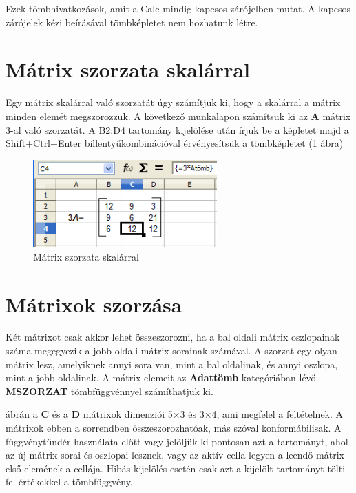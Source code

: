 Ezek tömbhivatkozások, amit a Calc mindig kapcsos zárójelben
mutat. A kapcsos zárójelek kézi beírásával tömbképletet
nem hozhatunk létre.


\section{Mátrix szorzata skalárral}

Egy mátrix skalárral való szorzatát úgy számítjuk ki, hogy
a skalárral a mátrix minden elemét megszorozzuk. A
következő munkalapon számítsuk ki az \textbf{A} mátrix 3-al
való szorzatát. A B2:D4 tartomány kijelölése után írjuk
be a képletet majd a Shift+Ctrl+Enter billentyűkombinációval
érvényesítsük a tömbképletet (\ref{MátrixSzorzataSkalárral} ábra)

\begin{figure}[!h]
\begin{center}
\includegraphics[width=7.077cm]{oocalcv2-img132.png}
\caption{Mátrix szorzata skalárral}\label{MátrixSzorzataSkalárral}
\end{center}
\end{figure}


\section{Mátrixok szorzása}

Két mátrixot csak akkor lehet összeszorozni, ha a bal oldali
mátrix oszlopainak száma megegyezik a jobb oldali mátrix sorainak
számával. A szorzat egy olyan mátrix lesz, amelyiknek annyi sora
van, mint a bal oldalinak, és annyi oszlopa, mint a jobb oldalinak. A
mátrix elemeit az \textbf{Adattömb} kategóriában lévő
\textbf{MSZORZAT} tömbfüggvénnyel számíthatjuk ki.

 ábrán a \textbf{C} és a \textbf{D}
mátrixok dimenziói
5×3 és 3×4, ami megfelel a feltételnek. A mátrixok ebben a
sorrendben összeszorozhatóak, más szóval konformábilisak. A
függvénytündér használata előtt vagy jelöljük ki
pontosan azt a tartományt, ahol az új mátrix sorai és oszlopai
lesznek, vagy az aktív cella legyen a leendő mátrix első
elemének a cellája. Hibás kijelölés esetén csak azt a kijelölt
tartományt tölti fel értékekkel a tömbfüggvény.

